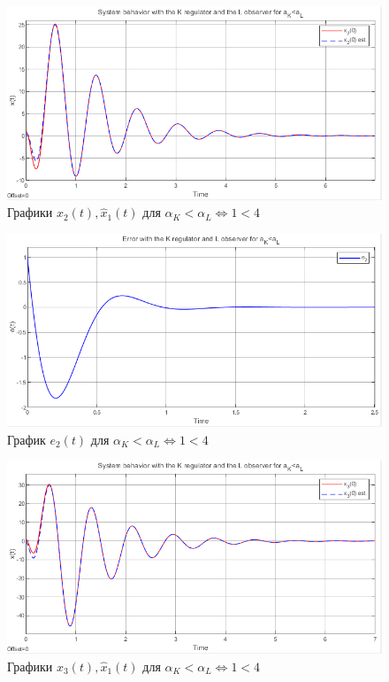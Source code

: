 \documentclass[a4paper, 12pt]{article}
\begin{document}
    \newpage
    \vspace*{20mm}
    \begin{figure}[H]
        \centering
        \includegraphics[scale=0.8]{2task_aKlaL_x2.png}
        \captionsetup{skip=0pt}
        \caption{Графики $x_2(t),\hat{x}_1(t)$ для $\alpha_K<\alpha_L\Leftrightarrow1<4$}
        \label{2task_aKlaL_x2}
    \end{figure}
    \begin{figure}[H]
        \centering
        \includegraphics[scale=0.8]{2task_aKlaL_e2.png}
        \captionsetup{skip=0pt}
        \caption{График $e_2(t)$ для $\alpha_K<\alpha_L\Leftrightarrow1<4$}
        \label{2task_aKlaL_e2}
    \end{figure}
    \newpage
    \vspace*{20mm}
    \begin{figure}[H]
        \centering
        \includegraphics[scale=0.8]{2task_aKlaL_x3.png}
        \captionsetup{skip=0pt}
        \caption{Графики $x_3(t),\hat{x}_1(t)$ для $\alpha_K<\alpha_L\Leftrightarrow1<4$}
        \label{2task_aKlaL_x3}
    \end{figure}
\end{document}
